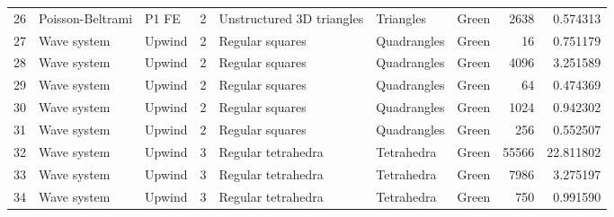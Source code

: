 \begin{tabular}{lllrlllrr}
26  &  Poisson-Beltrami &                          P1 FE &               2 &                 Unstructured 3D triangles &              Triangles  &                                Green &                     2638 &                         0.574313 \\
27  &       Wave system &                         Upwind &               2 &                           Regular squares &            Quadrangles  &                                Green &                       16 &                         0.751179 \\
28  &       Wave system &                         Upwind &               2 &                           Regular squares &            Quadrangles  &                                Green &                     4096 &                         3.251589 \\
29  &       Wave system &                         Upwind &               2 &                           Regular squares &            Quadrangles  &                                Green &                       64 &                         0.474369 \\
30  &       Wave system &                         Upwind &               2 &                           Regular squares &            Quadrangles  &                                Green &                     1024 &                         0.942302 \\
31  &       Wave system &                         Upwind &               2 &                           Regular squares &            Quadrangles  &                                Green &                      256 &                         0.552507 \\
32  &       Wave system &                         Upwind &               3 &                        Regular tetrahedra &             Tetrahedra  &                                Green &                    55566 &                        22.811802 \\
33  &       Wave system &                         Upwind &               3 &                        Regular tetrahedra &             Tetrahedra  &                                Green &                     7986 &                         3.275197 \\
34  &       Wave system &                         Upwind &               3 &                        Regular tetrahedra &             Tetrahedra  &                                Green &                      750 &                         0.991590 \\

\end{tabular}
